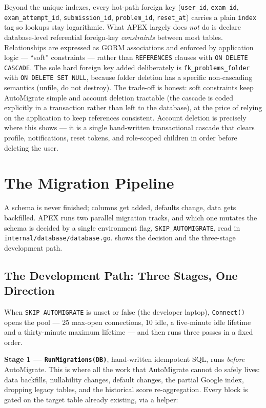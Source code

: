Beyond the unique indexes, every hot-path foreign key
(\texttt{user\_id}, \texttt{exam\_id}, \texttt{exam\_attempt\_id},
\texttt{submission\_id}, \texttt{problem\_id}, \texttt{reset\_at}) carries a
plain \texttt{index} tag so lookups stay logarithmic. What APEX largely does
\emph{not} do is declare database-level referential foreign-key
\emph{constraints} between most tables. Relationships are expressed as GORM
associations and enforced by application logic --- ``soft'' constraints ---
rather than \texttt{REFERENCES} clauses with \texttt{ON DELETE CASCADE}. The
sole hard foreign key added deliberately is \texttt{fk\_problems\_folder}
with \texttt{ON DELETE SET NULL}, because folder deletion has a specific
non-cascading semantics (unfile, do not destroy). The trade-off is honest:
soft constraints keep AutoMigrate simple and account deletion tractable (the
cascade is coded explicitly in a transaction rather than left to the
database), at the price of relying on the application to keep references
consistent. Account deletion is precisely where this shows --- it is a
single hand-written transactional cascade that clears profile,
notifications, reset tokens, and role-scoped children in order before
deleting the user.

\section{The Migration Pipeline}\label{sec:migrations}

A schema is never finished; columns get added, defaults change, data gets
backfilled. APEX runs two parallel migration tracks, and which one mutates the
schema is decided by a single environment flag, \texttt{SKIP\_AUTOMIGRATE},
read in \texttt{internal/database/database.go}.  shows the
decision and the three-stage development path.



\subsection{The Development Path: Three Stages, One Direction}

When \texttt{SKIP\_AUTOMIGRATE} is unset or false (the developer laptop),
\texttt{Connect()} opens the pool --- 25 max-open connections, 10 idle, a
five-minute idle lifetime and a thirty-minute maximum lifetime --- and then
runs three passes in a fixed order.

\textbf{Stage 1 --- \texttt{RunMigrations(DB)}}, hand-written idempotent SQL,
runs \emph{before} AutoMigrate. This is where all the work that AutoMigrate
cannot do safely lives: data backfills, nullability changes, default changes,
the partial Google index, dropping legacy tables, and the historical score
re-aggregation. Every block is gated on the target table already existing, via
a helper:

